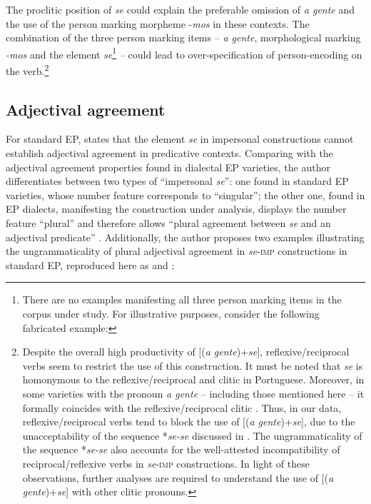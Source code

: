 \documentclass[output=paper]{langscibook}
\begin{document}
The proclitic position of \textit{se} could explain the preferable omission of \textit{a gente} and the use of the person marking morpheme {}-\textit{mos} in these contexts. The combination of the three person marking items  -- \textit{a gente}, morphological  marking \textit{{}-mos} and the element \textit{se}\footnote{There are no examples manifesting all three person marking items in the corpus under study. For illustrative purposes, consider the following fabricated example:
\z 
}
\textit{–} could lead to over-specification of  person-encoding on the verb.\footnote{Despite the overall high productivity of [(\textit{a gente})+\textit{se}], reflexive/reciprocal verbs seem to restrict the use of this construction. It must be noted that \textit{se} is homonymous to the reflexive/reciprocal  and  clitic in Portuguese. Moreover, in some varieties with the pronoun \textit{a gente}  -- including those mentioned here --  it formally coincides with the  reflexive/reciprocal clitic \citep[185]{Martins2009}. Thus, in our data, reflexive/reciprocal verbs tend to block the use of [(\textit{a gente})+\textit{se}], due to the unacceptability of the sequence *\textit{se-se} discussed in \citet[footnote 18]{Martins2009}. The ungrammaticality of the sequence *\textit{se-se} also accounts for the well-attested incompatibility of reciprocal/reflexive verbs in \textit{se}-\textsc{imp} constructions. In light of these observations, further analyses are required to understand the use of [(\textit{a gente})+\textit{se}] with other clitic pronouns.} 

\subsection{Adjectival agreement}\label{sec:henriques:5.3}

For standard EP, \citet[191-192]{Martins2009} states that the element \textit{se} in impersonal constructions cannot establish adjectival agreement in predicative contexts. Comparing with the adjectival agreement properties found in dialectal EP varieties, the author differentiates between two types of “impersonal \textit{se}”: one found in standard EP varieties, whose number feature corresponds to “singular”; the other one, found in EP dialects, manifesting the construction under analysis, displays the number feature “plural” and therefore allows “plural agreement between \textit{se} and an adjectival predicate” \citep[192]{Martins2009}. Additionally, the author proposes two examples illustrating the ungrammaticality of plural adjectival agreement in \textit{se}-\textsc{imp} constructions in standard EP, reproduced here as  and :
\end{document}
